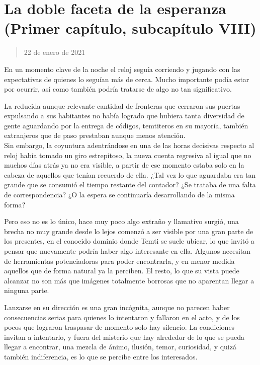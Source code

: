 \documentclass[
  spanish,
]{book}
\begin{document}
\hypertarget{la-doble-faceta-de-la-esperanza-primer-capuxedtulo-subcapuxedtulo-viii}{%
\section{La doble faceta de la esperanza (Primer capítulo, subcapítulo VIII)}\label{la-doble-faceta-de-la-esperanza-primer-capuxedtulo-subcapuxedtulo-viii}}

\begin{quote}
22 de enero de 2021
\end{quote}

En un momento clave de la noche el reloj seguía corriendo y jugando con las expectativas de quienes lo seguían más de cerca. Mucho importante podía estar por ocurrir, así como también podría tratarse de algo no tan significativo.

La reducida aunque relevante cantidad de fronteras que cerraron sus puertas expulsando a sus habitantes no había logrado que hubiera tanta diversidad de gente aguardando por la entrega de códigos, temtiteros en su mayoría, también extranjeros que de paso prestaban aunque menos atención.\\
Sin embargo, la coyuntura adentrándose en una de las horas decisivas respecto al reloj había tomado un giro estrepitoso, la nueva cuenta regresiva al igual que no muchos días atrás ya no era visible, a partir de ese momento estaba solo en la cabeza de aquellos que tenían recuerdo de ella. ¿Tal vez lo que aguardaba era tan grande que se consumió el tiempo restante del contador? ¿Se trataba de una falta de correspondencia? ¿O la espera se continuaría desarrollando de la misma forma?

Pero eso no es lo único, hace muy poco algo extraño y llamativo surgió, una brecha no muy grande desde lo lejos comenzó a ser visible por una gran parte de los presentes, en el conocido dominio donde Temti se suele ubicar, lo que invitó a pensar que nuevamente podría haber algo interesante en ella. Algunos necesitan de herramientas potenciadoras para poder encontrarla, y en menor medida aquellos que de forma natural ya la perciben. El resto, lo que su vista puede alcanzar no son más que imágenes totalmente borrosas que no aparentan llegar a ninguna parte.

Lanzarse en su dirección es una gran incógnita, aunque no parecen haber consecuencias serias para quienes lo intentaron y fallaron en el acto, y de los pocos que lograron traspasar de momento solo hay silencio. La condiciones invitan a intentarlo, y fuera del misterio que hay alrededor de lo que se pueda llegar a encontrar, una mezcla de ánimo, ilusión, temor, curiosidad, y quizá también indiferencia, es lo que se percibe entre los interesados.
\end{document}
